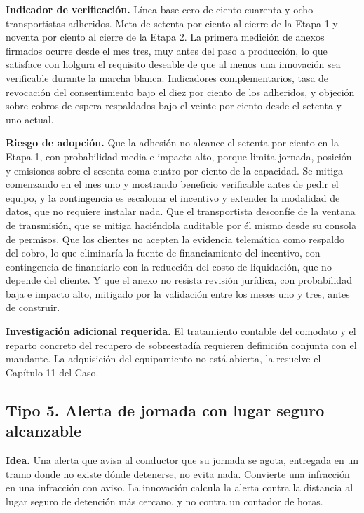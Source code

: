 \textbf{Indicador de verificación.} Línea base cero de ciento cuarenta y ocho transportistas
adheridos. Meta de setenta por ciento al cierre de la Etapa 1 y noventa por ciento al cierre de la
Etapa 2. La primera medición de anexos firmados ocurre desde el mes tres, muy antes del paso a
producción, lo que satisface con holgura el requisito deseable de que al menos una innovación sea
verificable durante la marcha blanca. Indicadores complementarios, tasa de revocación del
consentimiento bajo el diez por ciento de los adheridos, y objeción sobre cobros de espera
respaldados bajo el veinte por ciento desde el setenta y uno actual.

\textbf{Riesgo de adopción.} Que la adhesión no alcance el setenta por ciento en la Etapa 1, con
probabilidad media e impacto alto, porque limita jornada, posición y emisiones sobre el sesenta
coma cuatro por ciento de la capacidad. Se mitiga comenzando en el mes uno y mostrando beneficio
verificable antes de pedir el equipo, y la contingencia es escalonar el incentivo y extender la
modalidad de datos, que no requiere instalar nada. Que el transportista desconfíe de la ventana de
transmisión, que se mitiga haciéndola auditable por él mismo desde su consola de permisos. Que los
clientes no acepten la evidencia telemática como respaldo del cobro, lo que eliminaría la fuente de
financiamiento del incentivo, con contingencia de financiarlo con la reducción del costo de
liquidación, que no depende del cliente. Y que el anexo no resista revisión jurídica, con
probabilidad baja e impacto alto, mitigado por la validación entre los meses uno y tres, antes de
construir.

\textbf{Investigación adicional requerida.} El tratamiento contable del comodato y el reparto
concreto del recupero de sobreestadía requieren definición conjunta con el mandante. La adquisición
del equipamiento no está abierta, la resuelve el Capítulo 11 del Caso.

\subsection{Tipo 5. Alerta de jornada con lugar seguro alcanzable}

\textbf{Idea.} Una alerta que avisa al conductor que su jornada se agota, entregada en un tramo
donde no existe dónde detenerse, no evita nada. Convierte una infracción en una infracción con
aviso. La innovación calcula la alerta contra la distancia al lugar seguro de detención más
cercano, y no contra un contador de horas.

